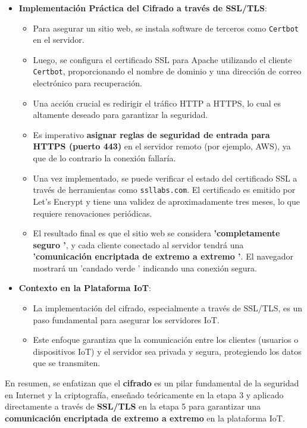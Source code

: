 \documentclass{report}
\begin{document}
\begin{itemize}
    \item \textbf{Implementación Práctica del Cifrado a través de SSL/TLS}:
    \begin{itemize}
        \item Para asegurar un sitio web, se instala software de terceros como \texttt{Certbot} en el servidor.
        \item Luego, se configura el certificado SSL para Apache utilizando el cliente \texttt{Certbot}, proporcionando el nombre de dominio y una 
        dirección de correo electrónico para recuperación.
        \item Una acción crucial es redirigir el tráfico HTTP a HTTPS, lo cual es altamente deseado para garantizar la seguridad.
        \item Es imperativo \textbf{asignar reglas de seguridad de entrada para HTTPS (puerto 443)} en el servidor remoto (por ejemplo, AWS), ya que 
        de lo contrario la conexión fallaría.
        \item Una vez implementado, se puede verificar el estado del certificado SSL a través de herramientas como \verb|ssllabs.com|. El certificado 
        es emitido por Let's Encrypt y tiene una validez de aproximadamente tres meses, lo que requiere renovaciones periódicas.
        \item El resultado final es que el sitio web se considera \textbf{ 'completamente seguro '}, y cada cliente conectado al servidor tendrá 
        una \textbf{ 'comunicación encriptada de extremo a extremo '}. El navegador mostrará un  'candado verde ' indicando una conexión segura.
    \end{itemize}

    \item \textbf{Contexto en la Plataforma IoT}:
    \begin{itemize}
        \item La implementación del cifrado, especialmente a través de SSL/TLS, es un paso fundamental para asegurar los servidores IoT.
        \item Este enfoque garantiza que la comunicación entre los clientes (usuarios o dispositivos IoT) y el servidor sea privada y segura, 
        protegiendo los datos que se transmiten.
    \end{itemize}
\end{itemize}
En resumen, se  enfatizan que el \textbf{cifrado} es un pilar fundamental de la seguridad en Internet y la criptografía, enseñado 
teóricamente en la etapa 3 y aplicado directamente a través de \textbf{SSL/TLS} en la etapa 5 para garantizar una \textbf{comunicación 
encriptada de extremo a extremo} en la plataforma IoT.
\end{document}
